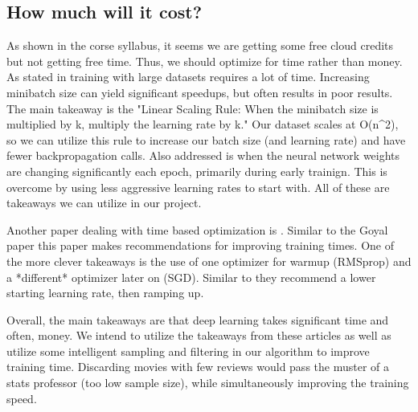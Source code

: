 \subsection{How much will it cost?}
As shown in the corse syllabus, it seems we are getting some free cloud credits but not getting free time. Thus, we should optimize for time rather than money. As stated in \cite{Goyal2017} training with large datasets requires a lot of time. Increasing minibatch size can yield significant speedups, but often results in poor results. The main takeaway is the "Linear Scaling Rule: When the minibatch size is multiplied by k, multiply the learning rate by k." Our dataset scales at O(n^2), so we can utilize this rule to increase our batch size (and learning rate) and have fewer backpropagation calls. Also addressed is when the neural network weights are changing significantly each epoch, primarily during early trainign. This is overcome by using less aggressive learning rates to start with. All of these are takeaways we can utilize in our project.

Another paper dealing with time based optimization is \cite{Akiba2017}. Similar to the Goyal paper this paper makes recommendations for improving training times. One of the more clever takeaways is the use of one optimizer for warmup (RMSprop) and a *different* optimizer later on (SGD). Similar to \cite{Goyal2017} they recommend a lower starting learning rate, then ramping up.

Overall, the main takeaways are that deep learning takes significant time and often, money. We intend to utilize the takeaways from these articles as well as utilize some intelligent sampling and filtering in our algorithm to improve training time. Discarding movies with few reviews would pass the muster of a stats professor (too low sample size), while simultaneously improving the training speed.